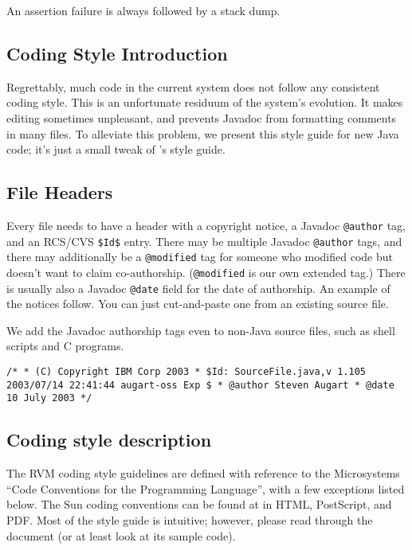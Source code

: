 An assertion failure is always followed by a stack dump.


\subsection{Coding Style Introduction}

Regrettably, much code in the current system does not follow any
consistent coding style.  This is an unfortunate residuum of the
system's evolution.  It makes editing sometimes unpleasant, and
prevents Javadoc from formatting comments in many files.  To alleviate
this problem, we present this style guide for new Java code; it's just
a small tweak of \SunRweb{}'s style guide.

\subsection{File Headers}

Every file needs to have a header with a copyright notice, a Javadoc
{\tt @author} tag, and an RCS/CVS {\tt \$Id\$} entry. There may be
multiple Javadoc {\tt @author} tags, and there may
additionally be a {\tt @modified} tag for someone who modified code but
doesn't want to claim co-authorship.  ({\tt @modified} is our own
extended tag.)  There is usually also a Javadoc {\tt @date} field for
the date of authorship.  An example of the notices follow.  You can
just cut-and-paste one from an existing source file.

We add the Javadoc authorship tags even to non-Java source files, such
as shell scripts and C programs.
\begin{example}
\tt{}/*
 * (C) Copyright IBM Corp 2003
 * \${}Id{}: SourceFile.java,v 1.105 2003/07/14 22:41:44 augart-oss Exp \$
 * @author Steven Augart
 * @date 10 July 2003
 */
\end{example}


\subsection {Coding style description}

The \JikesTMweb{} RVM coding style guidelines are defined with
reference to the \SunRweb{} 
Microsystems ``Code Conventions for the \JavaTMweb{} Programming Language'',
with a few exceptions listed below.  The Sun coding
conventions can be found at 
\xlink{{\tt \SunCodeConventionURL}} {\SunCodeConventionURL} in HTML,
PostScript, and PDF.  Most of the style guide is intuitive; 
however, please read through the document (or at least look at its sample code).

